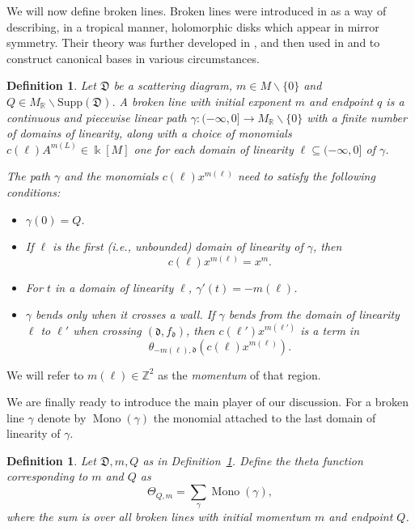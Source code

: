 \documentclass[10pt]{amsart}
\newtheorem{defn}[theorem]{Definition}
\theoremstyle{remark}
\numberwithin{equation}{section}
\newcommand{\RR}{\mathbb{R}}
\newcommand{\fd}{\mathfrak{d}}
\newcommand{\fD}{\mathfrak{D}}
\newcommand{\Mono}{\operatorname{Mono}}
\begin{document}
We will now define broken lines. Broken lines were introduced in \cite{G10} as a
way of describing, in a tropical manner,  holomorphic disks which appear in
mirror symmetry.  Their theory was further developed in \cite{CPS}, and then
used in \cite{GHK11} and \cite{GHKK} to construct canonical bases in various
circumstances.

\begin{defn} 
  \label{brokendef}
  Let $\fD$ be a scattering diagram, $m \in M \backslash \{0\}$ and $Q \in
  M_{\RR} \backslash \text{Supp}(\fD)$.  A \emph{broken line} with initial
  \emph{exponent} $m$ and endpoint $q$ is a continuous and piecewise linear path
  $\gamma : ( - \infty , 0] \rightarrow M_{\mathbb{R}} \backslash \{ 0\} $ with
  a finite number of domains of linearity, along with a choice of monomials
  $c(\ell) A^{m(L)} \in \Bbbk[M]$ one for each domain of linearity $\ell \subseteq ( -
  \infty, 0]$ of $\gamma$. 
  
  The path $\gamma$ and the monomials $c(\ell) x^{m(\ell)}$ need to satisfy the
  following conditions:
  \begin{itemize}
    \item 
      $\gamma(0) = Q$.
    
    \item 
      If $\ell$ is the first (i.e., unbounded) domain of linearity of $\gamma$,
      then 
      \[
        c(\ell) x^{m(\ell)} = x^{m}.
      \]

    \item 
      For $t$ in a domain of linearity $\ell$, $\gamma'(t) = -m(\ell)$.

    \item 
      $\gamma$ bends only when it crosses a wall. If $\gamma$ bends from the
      domain of linearity $\ell$ to $ \ell'$ when crossing $(\fd, f_{\fd})$, then
      $c(\ell')x^{m(\ell')}$ is a term in 
      \[
        \theta_{-m(\ell), \fd} \left(c(\ell) x^{m(\ell)}\right).
      \]
  \end{itemize}
\end{defn}
We will refer to $m(\ell)\in \mathbb{Z}^2$ as the \emph{momentum} of that region.

We are finally ready to introduce the main player of our discussion.
For a broken line $\gamma$  denote by
$\Mono (\gamma)$ the monomial attached to the last domain of linearity of $\gamma$.
\begin{defn}
  Let $\fD, m, Q$ as in Definition~\ref{brokendef}.  Define the \emph{theta function} corresponding to $m$ and $Q$
  as
  \[ 
    \Theta_{Q, m} = \sum_{\gamma} \Mono (\gamma), 
  \] 
  where the sum is over all broken lines with initial momentum $m$ and endpoint
  $Q$.
\end{defn}
\end{document}
